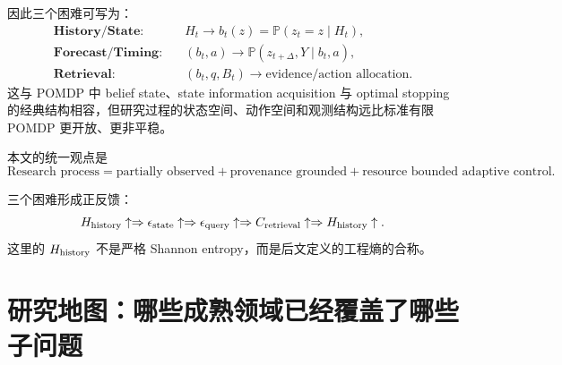 \documentclass[11pt,a4paper]{ctexart}
\newcommand{\Pp}{\mathbb{P}}
\begin{document}
因此三个困难可写为：
\begin{align}
\textbf{History/State:}\quad & H_t\longrightarrow b_t(z)=\Pp(z_t=z\mid H_t),\\
\textbf{Forecast/Timing:}\quad & (b_t,a)\longrightarrow \Pp(z_{t+\Delta},Y\mid b_t,a),\\
\textbf{Retrieval:}\quad & (b_t,q,B_t)\longrightarrow \text{evidence/action allocation}.
\end{align}
这与 POMDP 中 belief state、state information acquisition 与 optimal stopping 的经典结构相容\parencite{monahan1982pomdp,lauri2022pomdp}，但研究过程的状态空间、动作空间和观测结构远比标准有限 POMDP 更开放、更非平稳。

本文的统一观点是
\begin{equation}
\boxed{\text{Research process}=\text{partially observed}+\text{provenance grounded}+\text{resource bounded adaptive control}.}
\end{equation}

三个困难形成正反馈：
\begin{equation}
 H_{\rm history}\uparrow\Rightarrow
 \epsilon_{\rm state}\uparrow\Rightarrow
 \epsilon_{\rm query}\uparrow\Rightarrow
 C_{\rm retrieval}\uparrow\Rightarrow
 H_{\rm history}\uparrow.
\end{equation}
这里的 $H_{\rm history}$ 不是严格 Shannon entropy，而是后文定义的工程熵的合称。

\section{研究地图：哪些成熟领域已经覆盖了哪些子问题}
\end{document}
